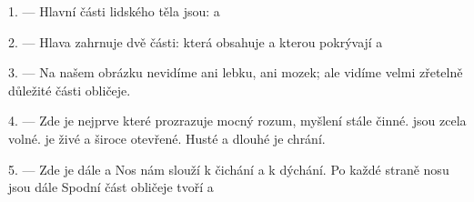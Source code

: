 %
%

\VUsaut{4.0mm}
\VUsaut{2.0mm}

\VUsaut{2.4mm}
\VUsaut{3.0mm}

1. --- Hlavní části lidského těla jsou:   a

\VUsaut{3.0mm}

2. --- Hlava zahrnuje dvě části:  která obsahuje  a
kterou pokrývají  a 

3. --- Na našem obrázku nevidíme ani lebku, ani mozek; ale vidíme velmi zřetelně
důležité části obličeje.

4. --- Zde je nejprve  které prozrazuje mocný rozum, myšlení stále
činné.  jsou zcela volné.  je živé a široce otevřené.
Husté  a dlouhé  je chrání.

5. --- Zde je dále  a  Nos nám slouží k čichání a k
dýchání. Po každé straně nosu jsou  dále  Spodní část
obličeje tvoří  a 

